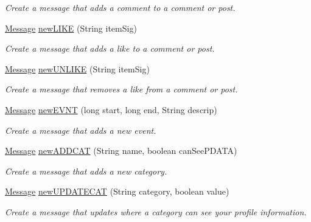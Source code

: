 \begin{DoxyCompactItemize}
\begin{DoxyCompactList}\small\item\em Create a message that adds a comment to a comment or post. \end{DoxyCompactList}\item 
\hyperlink{classballmerpeak_1_1turtlenet_1_1shared_1_1Message}{Message} \hyperlink{classballmerpeak_1_1turtlenet_1_1server_1_1MessageFactory_a38bba7934fa384ff258714a9506029f8}{new\-L\-I\-K\-E} (String item\-Sig)
\begin{DoxyCompactList}\small\item\em Create a message that adds a like to a comment or post. \end{DoxyCompactList}\item 
\hyperlink{classballmerpeak_1_1turtlenet_1_1shared_1_1Message}{Message} \hyperlink{classballmerpeak_1_1turtlenet_1_1server_1_1MessageFactory_ab70cf1c0f0ec11df5d5a55c444dee6c0}{new\-U\-N\-L\-I\-K\-E} (String item\-Sig)
\begin{DoxyCompactList}\small\item\em Create a message that removes a like from a comment or post. \end{DoxyCompactList}\item 
\hyperlink{classballmerpeak_1_1turtlenet_1_1shared_1_1Message}{Message} \hyperlink{classballmerpeak_1_1turtlenet_1_1server_1_1MessageFactory_aec8e8561f1583c781f5bb11719def583}{new\-E\-V\-N\-T} (long start, long end, String descrip)
\begin{DoxyCompactList}\small\item\em Create a message that adds a new event. \end{DoxyCompactList}\item 
\hyperlink{classballmerpeak_1_1turtlenet_1_1shared_1_1Message}{Message} \hyperlink{classballmerpeak_1_1turtlenet_1_1server_1_1MessageFactory_ac31e65610f9ec3966639894fb47d7afc}{new\-A\-D\-D\-C\-A\-T} (String name, boolean can\-See\-P\-D\-A\-T\-A)
\begin{DoxyCompactList}\small\item\em Create a message that adds a new category. \end{DoxyCompactList}\item 
\hyperlink{classballmerpeak_1_1turtlenet_1_1shared_1_1Message}{Message} \hyperlink{classballmerpeak_1_1turtlenet_1_1server_1_1MessageFactory_ac9f69e89c9075dbc495aea39161fbdc4}{new\-U\-P\-D\-A\-T\-E\-C\-A\-T} (String category, boolean value)
\begin{DoxyCompactList}\small\item\em Create a message that updates where a category can see your profile information. \end{DoxyCompactList}\item 

\end{DoxyCompactItemize}
